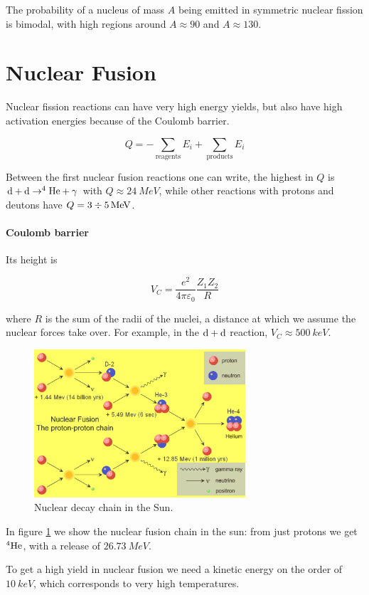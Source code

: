 \documentclass[main.tex]{subfiles}
\begin{document}
The probability of a nucleus of mass \(A\) being emitted in symmetric nuclear fission is bimodal, with high regions around \(A \approx 90\) and \(A \approx 130\).

\section{Nuclear Fusion}

Nuclear fission reactions can have very high energy yields,  but also have high activation energies because of the Coulomb barrier.

\begin{equation}
    Q = - \sum _ \text{reagents} E_i + \sum _{\text{products}} E_i
\end{equation}

Between the first nuclear fusion reactions one can write, the highest in \(Q\) is \(\ce{d}+\ce{d} \rightarrow ^{4} \ce{He} + \gamma\) with \(Q  \approx  \SI{24}{MeV} \), while other reactions with protons and deutons have \(Q = 3 \divisionsymbol \SI{5}{MeV} \).

\paragraph{Coulomb barrier}

Its height is

\begin{equation}
    V_C = \frac{e^2}{4 \pi \varepsilon_0} \frac{Z_1 Z_2}{R}
\end{equation}

where \(R\) is the sum of the radii of the nuclei, a distance at which we assume the nuclear forces take over. For example, in the \(\ce{d} + \ce{d}\) reaction, \(V_C \approx \SI{500}{keV} \).

\begin{figure}[H]
    \centering
    \includegraphics[width=0.7\textwidth]{figures/sun_nuclear_fusion.png}
    \caption{Nuclear decay chain in the Sun.}
    \label{fig:nuclear-fusion-sun}
\end{figure}

In figure \ref{fig:nuclear-fusion-sun} we show the nuclear fusion chain in the sun: from just protons we get \(^{4} \ce{He} \), with a release of \(\SI{26.73}{MeV} \).

To get a high yield in nuclear fusion we need a kinetic energy on the order of \(\SI{10}{keV} \), which corresponds to very high temperatures.
\end{document}
